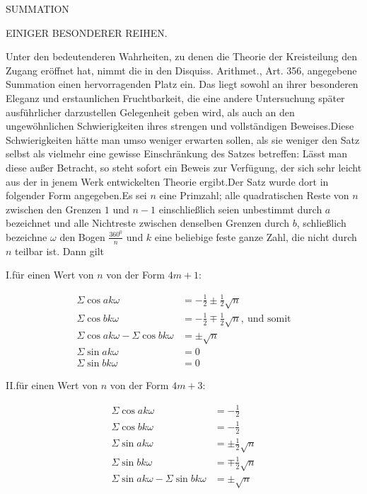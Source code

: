 \begin{center}\Large SUMMATION\end{center}

\begin{center}\large EINIGER BESONDERER REIHEN.\end{center}

\BookRule{22mm}


Unter den bedeutenderen Wahrheiten, zu denen die Theorie der Kreisteilung den Zugang eröffnet hat, nimmt die in den Disquiss. Arithmet., Art. 356, angegebene Summation einen hervorragenden Platz ein. Das liegt sowohl an ihrer besonderen Eleganz und erstaunlichen Fruchtbarkeit, die eine andere Untersuchung später ausführlicher darzustellen Gelegenheit geben wird, als auch an den ungewöhnlichen Schwierigkeiten ihres strengen und vollständigen Beweises.\quad Diese Schwierigkeiten hätte man umso weniger erwarten sollen, als sie weniger den Satz selbst als vielmehr eine gewisse Einschränkung des Satzes betreffen: Lässt man diese außer Betracht, so steht sofort ein Beweis zur Verfügung, der sich sehr leicht aus der in jenem Werk entwickelten Theorie ergibt.\quad Der Satz wurde dort in folgender Form angegeben.\quad Es sei $n$ eine Primzahl; alle quadratischen Reste von $n$ zwischen den Grenzen $1$ und $n-1$ einschließlich seien unbestimmt durch $a$ bezeichnet und alle Nichtreste zwischen denselben Grenzen durch $b$, schließlich bezeichne $\omega$ den Bogen $\frac{360^{0}}{n}$ und $k$ eine beliebige feste ganze Zahl, die nicht durch $n$ teilbar ist. Dann gilt

I.\quad für einen Wert von $n$ von der Form $4m+1$:

\[
\begin{aligned}
\Sigma\cos ak\omega&=-\tfrac12\pm\tfrac12\surd n\\
\Sigma\cos bk\omega&=-\tfrac12\mp\tfrac12\surd n,\ \text{und somit}\\
\Sigma\cos ak\omega-\Sigma\cos bk\omega&=\pm\surd n\\
\Sigma\sin ak\omega&=0\\
\Sigma\sin bk\omega&=0
\end{aligned}
\]

II.\quad für einen Wert von $n$ von der Form $4m+3$:

\[
\begin{aligned}
\Sigma\cos ak\omega&=-\tfrac12\\
\Sigma\cos bk\omega&=-\tfrac12\\
\Sigma\sin ak\omega&=\pm\tfrac12\surd n\\
\Sigma\sin bk\omega&=\mp\tfrac12\surd n\\
\Sigma\sin ak\omega-\Sigma\sin bk\omega&=\pm\surd n
\end{aligned}
\]

